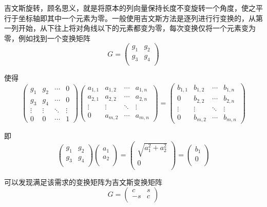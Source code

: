 \documentclass{source/Report}
\begin{document}
吉文斯旋转，顾名思义，就是将原本的列向量保持长度不变旋转一个角度，使之平行于坐标轴即其中一个元素为零。一般使用吉文斯方法是逐列进行行变换的，从第一列开始，从下往上将对角线以下的元素都变为零，每次变换仅将一个元素变为零，例如找到一个变换矩阵 \[G=\begin{pmatrix} g_1 & g_2 \\ g_3 & g_4 \\ \end{pmatrix} \]

使得 \[\begin{pmatrix} g_1 & g_2 & \cdots & 0 \\ g_3 & g_4 & \cdots & 0 \\ \vdots & \vdots & \ddots & \vdots \\ 0 & 0 & \cdots & 1 \end{pmatrix}\begin{pmatrix} a_{1,1} & a_{1,2} & \cdots & a_{1,n} \\ a_{2,1} & a_{2,2} & \cdots & a_{2,n} \\ \vdots & \vdots & \ddots & \vdots \\ 0 & a_{m,2} & \cdots & a_{m,n} \end{pmatrix}=\begin{pmatrix} b_{1,1} & b_{1,2} & \cdots & b_{1,n} \\ 0 & b_{2,2} & \cdots & b_{2,n} \\ \vdots & \vdots & \ddots & \vdots \\ 0 & b_{m,2} & \cdots & b_{m,n} \end{pmatrix}\]

即\[ \begin{pmatrix} g_1 & g_2 \\ g_3 & g_4 \\ \end{pmatrix} \begin{pmatrix} a_1 \\ a_2 \\ \end{pmatrix}= \begin{pmatrix} \sqrt{a_1^2+a_2^2} \\ 0 \\ \end{pmatrix}= \begin{pmatrix} b_1 \\ 0 \\ \end{pmatrix} \]

可以发现满足该需求的变换矩阵为吉文斯变换矩阵 \[G=\begin{pmatrix} c & s \\ -s & c \\ \end{pmatrix} \]
\end{document}
